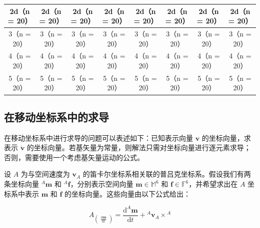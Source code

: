 \documentclass[10pt,a4paper]{book}
\theoremstyle{thmstyle} %
\theoremstyle{defstyle} %
\theoremstyle{prostyle} %
\begin{document}
\begin{table}[htbp]

\centering

\begin{tabular}{cccccccc}

\toprule

2d（n = 20） & 2d（n = 20） & 2d（n = 20） & 2d（n = 20） & 2d（n = 20） & 2d（n = 20） & 2d（n = 20） & 2d（n = 20） \\

\midrule

3（n = 20） & 3（n = 20） & 3（n = 20） & 3（n = 20） & 3（n = 20） & 3（n = 20） & 3（n = 20） & 3（n = 20） \\

4（n = 20） & 4（n = 20） & 4（n = 20） & 4（n = 20） & 4（n = 20） & 4（n = 20） & 4（n = 20） & 4（n = 20） \\

5（n = 20） & 5（n = 20） & 5（n = 20） & 5（n = 20） & 5（n = 20） & 5（n = 20） & 5（n = 20） & 5（n = 20） \\

\bottomrule

\end{tabular}

\end{table}



\subsection{在移动坐标系中的求导}





在移动坐标系中进行求导的问题可以表述如下：已知表示向量 $\boldsymbol{v}$ 的坐标向量，求表示 $\dot{\boldsymbol{v}}$ 的坐标向量。若基矢量为常量，则解法只需对坐标向量进行逐元素求导；否则，需要使用一个考虑基矢量运动的公式。



设 $A$ 为与空间速度为 $\boldsymbol{v}_{A}$ 的笛卡尔坐标系相关联的普吕克坐标系。假设我们有两条坐标向量 ${}^{A}\boldsymbol{m}$ 和 ${}^{A}\boldsymbol{f}$，分别表示空间向量 $\boldsymbol{m} \in \mathbb{M}^{6}$ 和 $\boldsymbol{f} \in \mathbb{F}^{6}$，并希望求出在 $A$ 坐标系中表示 $\boldsymbol{m}$ 和 $\dot{\boldsymbol{f}}$ 的坐标向量。这些向量由以下公式给出：



$$
A_{\begin{pmatrix}\frac{\mathrm{d}\boldsymbol{m}}{\mathrm{d}t}\end{pmatrix}}=\frac{\mathrm{d}^A\boldsymbol{m}}{\mathrm{d}t}+{}^A\boldsymbol{v}_A\times{}^A
$$
\end{document}
